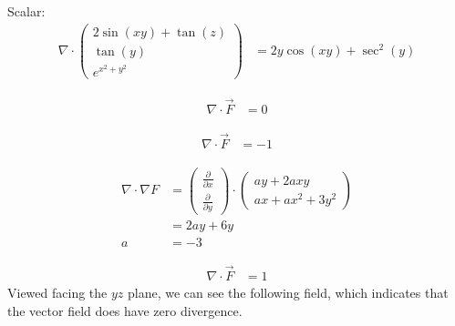 \documentclass[10pt]{extarticle}
\begin{document}
  \begin{problem}{19.3}
    \begin{description}[font=\normalfont]
      \item[2:] Scalar:
        \begin{align*}
          \nabla \cdot \begin{pmatrix}2\sin(xy) + \tan(z) \\ \tan(y) \\ e^{x^2 + y^2}\end{pmatrix} &= 2y\cos(xy) + \sec^2(y)
        \end{align*}
      \item[4:]
        \begin{align*}
          \nabla \cdot \vec{F} &= 0
        \end{align*}
      \item[6:]
        \begin{align*}
          \nabla \cdot \vec{F} &= -1
        \end{align*}
      \item[24:]
        \begin{align*}
          \nabla \cdot \nabla F &= \begin{pmatrix}\frac{\partial}{\partial x}\\\frac{\partial}{\partial y}\end{pmatrix} \cdot \begin{pmatrix}ay + 2axy\\ax + ax^2 + 3y^2\end{pmatrix}\\
                                &= 2ay + 6y\\
          a &= \boxed{-3}
        \end{align*}
      \item[28:]
        \begin{align*}
          \nabla \cdot \vec{F} &= 1
        \end{align*}
        Viewed facing the $yz$ plane, we can see the following field, which indicates that the vector field does have zero divergence.
        \begin{center}
        \end{center}
      \item[38:]
    \end{description}
  \end{problem}
\end{document}
